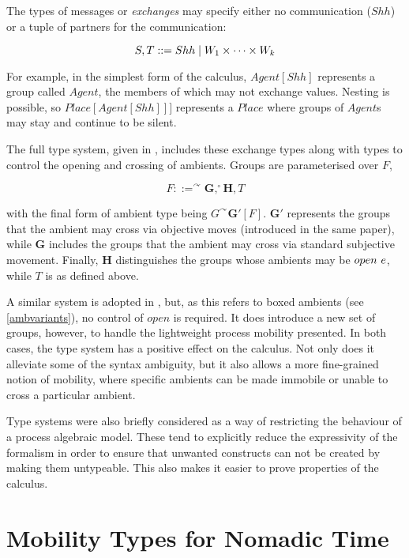 The types of messages or \emph{exchanges} may specify either no
communication ($Shh$) or a tuple of partners for the communication:

\begin{equation}
S, T ::= Shh \;|\; W_1 \times \dots \times W_k
\end{equation}

\noindent For example, in the simplest form of the calculus,
$Agent[Shh]$ represents a group called $Agent$, the members of which may
not exchange values.  Nesting is possible, so $Place[Agent[Shh]]]$
represents a $Place$ where groups of $Agent$s may stay and continue to
be silent.

The full type system, given in \cite{ambienttypes}, includes these
exchange types along with types to control the opening and crossing of
ambients.  Groups are parameterised over $F$,

\begin{equation}
F ::= ^\curvearrowright \mathbf{G}, ^\circ \mathbf{H}, T
\end{equation}

\noindent with the final form of ambient type being $G^\curvearrowright
\mathbf{G'}[F]$.  $\mathbf{G'}$ represents the groups that the ambient
may cross via objective moves (introduced in the same paper), while
$\mathbf{G}$ includes the groups that the ambient may cross via standard
subjective movement.  Finally, $\mathbf{H}$ distinguishes the groups
whose ambients may be $open\ e$, while $T$ is as defined above.

A similar system is adopted in \cite{m3}, but, as this refers to boxed
ambients (see \ref{ambvariants}), no control of $open$ is required.  It
does introduce a new set of groups, however, to handle the lightweight
process mobility presented.  In both cases, the type system has a
positive effect on the calculus.  Not only does it alleviate some of
the syntax ambiguity, but it also allows a more fine-grained notion of
mobility, where specific ambients can be made immobile or unable to
cross a particular ambient.

Type systems were also briefly considered as a way of restricting the
behaviour of a process algebraic model.  These tend to explicitly reduce
the expressivity of the formalism in order to ensure that unwanted
constructs can not be created by making them untypeable.  This also
makes it easier to prove properties of the calculus.  

\section{Mobility Types for Nomadic Time}
\label{typesys}

